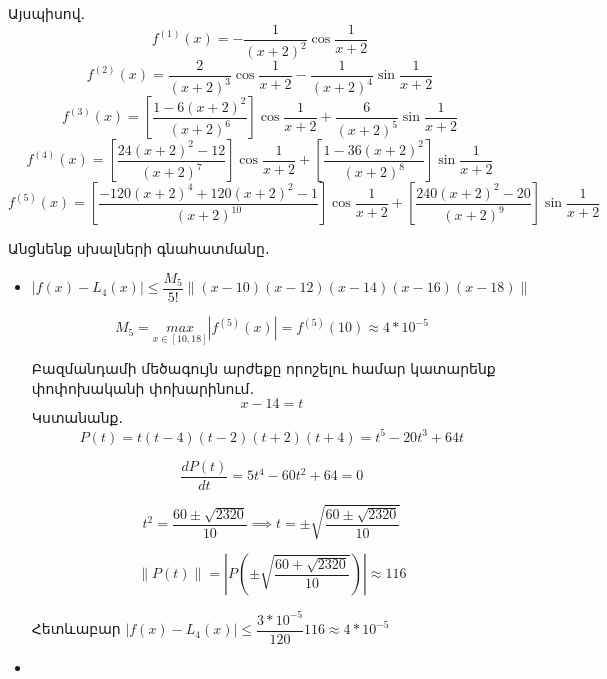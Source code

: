 \documentclass{article}
\begin{document}
\begin{enumerate}
	Այսպիսով․
					$$f^{\left( 1\right)}\left(x\right) = -\dfrac{1}{\left(x+2\right)^{2}} \cos\dfrac{1}{x + 2}$$
					$$f^{\left( 2\right)}\left(x\right) = \dfrac{2}{\left(x+2\right)^{3}} \cos\dfrac{1}{x + 2} - \dfrac{1}{\left(x+2\right)^{4}}\sin\dfrac{1}{x + 2}$$		
					$$f^{\left( 3\right)}\left(x\right) = \left[\dfrac{1-6\left(x+2\right)^2}{\left(x+2\right)^6}\right]  \cos\dfrac{1}{x + 2} + \dfrac{6}{\left(x+2\right)^{5}}  \sin\dfrac{1}{x + 2}$$		
					$$f^{\left( 4\right)}\left(x\right) = \left[\dfrac{24 \left(x+2\right)^{2} - 12}{\left(x+2\right)^{7}}\right] \cos\dfrac{1}{x + 2} + 
		\left[\dfrac{1 - 36 \left(x+2\right)^{2}}{\left(x+2\right)^{8}} \right] \sin\dfrac{1}{x + 2}$$
					$$f^{\left( 5\right)}\left(x\right) =\left[\dfrac{-120 \left(x+2\right)^{4} + 120 \left(x+2\right)^{2} - 1 }{\left(x+2\right)^{10}}\right] \cos\dfrac{1}{x + 2} + 
\left[\dfrac{240 \left(x+2\right)^{2} - 20 }{\left(x+2\right)^{9}}\right] \sin\dfrac{1}{x + 2} $$

		
	Անցնենք սխալների գնահատմանը․


\begin{itemize}

\item
	
	$|f\left(x\right) - L_{4}\left(x\right)| \leq \dfrac{M_{5}}{5!} \lVert \left(x - 10\right)\left(x - 12\right)\left(x - 14\right)\left(x - 16\right)\left(x - 18\right) \rVert$

	$$M_{5} = \underset{x \in \left[10, 18\right]}{max}\left|f^{\left(5\right)}\left(x\right)\right| = f^{\left(5\right)}\left(10\right) \approx 4 * 10^{-5}$$




	Բազմանդամի մեծագույն արժեքը որոշելու համար կատարենք փոփոխականի փոխարինում․
												$$x - 14 = t$$
	Կստանանք․
				$$P\left(t\right) = t \left(t-4\right) \left(t-2\right) \left(t+2\right) \left(t+4\right) = t^{5} - 20 t^{3} + 64t$$

				$$ \dfrac{d P\left(t\right)}{dt} = 5 t^{4} - 60 t^{2} + 64 = 0$$
				
				$$t^{2} = \dfrac{60 \pm \sqrt{2320}}{10} \implies t = \pm \sqrt{\dfrac{60 \pm \sqrt{2320}}{10}} $$

				$$\lVert P\left(t\right) \rVert = \left|P\left( \pm  \sqrt{\dfrac{60 + \sqrt{2320}}{10}}   \right)\right| \approx 116$$

				Հետևաբար $|f\left(x\right) - L_{4}\left(x\right)| \leq \dfrac{3 * 10^{-5}}{120} 116 \approx 4 * 10^{-5}$

\item


\end{itemize}
\end{enumerate}
\end{document}
